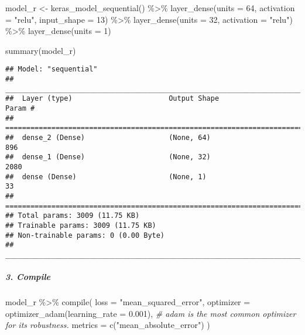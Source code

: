 \documentclass[
]{article}
\newenvironment{Shaded}{\begin{snugshade}}{\end{snugshade}}
\newcommand{\AttributeTok}[1]{\textcolor[rgb]{0.77,0.63,0.00}{#1}}
\newcommand{\CommentTok}[1]{\textcolor[rgb]{0.56,0.35,0.01}{\textit{#1}}}
\newcommand{\DecValTok}[1]{\textcolor[rgb]{0.00,0.00,0.81}{#1}}
\newcommand{\FloatTok}[1]{\textcolor[rgb]{0.00,0.00,0.81}{#1}}
\newcommand{\FunctionTok}[1]{\textcolor[rgb]{0.00,0.00,0.00}{#1}}
\newcommand{\NormalTok}[1]{#1}
\newcommand{\OtherTok}[1]{\textcolor[rgb]{0.56,0.35,0.01}{#1}}
\newcommand{\SpecialCharTok}[1]{\textcolor[rgb]{0.00,0.00,0.00}{#1}}
\newcommand{\StringTok}[1]{\textcolor[rgb]{0.31,0.60,0.02}{#1}}
\begin{document}
\begin{Shaded}
\begin{Highlighting}[]
\NormalTok{model\_r }\OtherTok{\textless{}{-}} \FunctionTok{keras\_model\_sequential}\NormalTok{() }\SpecialCharTok{\%\textgreater{}\%}
  \FunctionTok{layer\_dense}\NormalTok{(}\AttributeTok{units =} \DecValTok{64}\NormalTok{, }\AttributeTok{activation =} \StringTok{"relu"}\NormalTok{, }\AttributeTok{input\_shape =} \DecValTok{13}\NormalTok{) }\SpecialCharTok{\%\textgreater{}\%}
  \FunctionTok{layer\_dense}\NormalTok{(}\AttributeTok{units =} \DecValTok{32}\NormalTok{, }\AttributeTok{activation =} \StringTok{"relu"}\NormalTok{) }\SpecialCharTok{\%\textgreater{}\%}
  \FunctionTok{layer\_dense}\NormalTok{(}\AttributeTok{units =} \DecValTok{1}\NormalTok{)}
  
\FunctionTok{summary}\NormalTok{(model\_r)}
\end{Highlighting}
\end{Shaded}

\begin{verbatim}
## Model: "sequential"
## ________________________________________________________________________________
##  Layer (type)                       Output Shape                    Param #     
## ================================================================================
##  dense_2 (Dense)                    (None, 64)                      896         
##  dense_1 (Dense)                    (None, 32)                      2080        
##  dense (Dense)                      (None, 1)                       33          
## ================================================================================
## Total params: 3009 (11.75 KB)
## Trainable params: 3009 (11.75 KB)
## Non-trainable params: 0 (0.00 Byte)
## ________________________________________________________________________________
\end{verbatim}

\hypertarget{compile}{%
\subparagraph{3. Compile}\label{compile}}

\begin{Shaded}
\begin{Highlighting}[]
\NormalTok{model\_r }\SpecialCharTok{\%\textgreater{}\%} \FunctionTok{compile}\NormalTok{(}
  \AttributeTok{loss =} \StringTok{"mean\_squared\_error"}\NormalTok{,}
  \AttributeTok{optimizer =} \FunctionTok{optimizer\_adam}\NormalTok{(}\AttributeTok{learning\_rate =} \FloatTok{0.001}\NormalTok{),  }\CommentTok{\# adam is the most common optimizer for its robustness.}
  \AttributeTok{metrics =} \FunctionTok{c}\NormalTok{(}\StringTok{"mean\_absolute\_error"}\NormalTok{)}
\NormalTok{)}
\end{Highlighting}
\end{Shaded}
\end{document}
